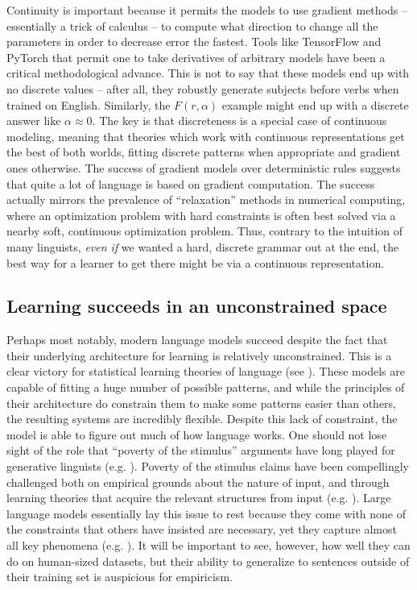 \documentclass[output=paper,colorlinks,citecolor=brown]{langscibook}
\begin{document}
Continuity is important because it permits the models to use gradient methods -- essentially a trick of calculus -- to compute what direction to change all the parameters in order to decrease error the fastest. Tools like TensorFlow and PyTorch that permit one to take derivatives of arbitrary models have been a critical methodological advance. This is not to say that these models end up with no discrete values -- after all, they robustly generate subjects before verbs when trained on English. Similarly, the $F(r,\alpha)$ example might end up with a discrete answer like $\alpha \approx 0$. The key is that discreteness is a special case of continuous modeling, meaning that theories which work with continuous representations get the best of both worlds, fitting discrete patterns when appropriate and gradient ones otherwise. The success of gradient models over deterministic rules suggests that quite a lot of language is based on gradient computation. The success actually mirrors the prevalence of ``relaxation'' methods in numerical computing, where an optimization problem with hard constraints is often best solved via a nearby soft, continuous optimization problem. Thus, contrary to the intuition of many linguists, \textit{even if} we wanted a hard, discrete grammar out at the end, the best way for a learner to get there might be via a continuous representation.

\subsection{Learning succeeds in an unconstrained space}

Perhaps most notably, modern language models succeed despite the fact that their underlying architecture for learning is relatively unconstrained. This is a clear victory for statistical learning theories of language (see \citealt{contreras2023large}). These models are capable of fitting a huge number of possible patterns, and while the principles of their architecture do constrain them to make some patterns easier than others, the resulting systems are incredibly flexible. Despite this lack of constraint, the model is able to figure out much of how language works. One should not lose sight of the role that ``poverty of the stimulus'' arguments have long played for generative linguists (e.g. \citealt{lasnik2016argument,crain2001nature,legate2002empirical,wexler1980formal,laurence2001poverty,pearl2022poverty,crain2002language}). Poverty of the stimulus claims have been compellingly challenged both on empirical grounds about the nature of input, and through learning theories that acquire the relevant structures from input (e.g. \citealt{pullum2002empirical,clark2010linguistic,perfors2011learnability,reali2005uncovering,solan2005unsupervised}). Large language models essentially lay this issue to rest because they come with none of the constraints that others have insisted are necessary, yet they capture almost all key phenomena (e.g. \citealt{wilcox2022using}). It will be important to see, however, how well they can do on human-sized datasets, but their ability to generalize to sentences outside of their training set is auspicious for empiricism.
\end{document}
